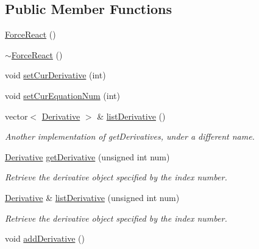 \subsection*{Public Member Functions}
\begin{DoxyCompactItemize}
\item 
\hyperlink{class_force_react_ac8f8b24f67f93f43ae1bb9c464a2d8d4}{Force\-React} ()
\item 
\hyperlink{class_force_react_a585f55d5c31c4951824bce98b6582afb}{$\sim$\-Force\-React} ()
\item 
void \hyperlink{class_force_react_ac387126f0628a06b24f53012725e384f}{set\-Cur\-Derivative} (int)
\item 
void \hyperlink{class_force_react_aca5dc15ce68dd63183aced244c13992c}{set\-Cur\-Equation\-Num} (int)
\item 
vector$<$ \hyperlink{class_derivative}{Derivative} $>$ \& \hyperlink{class_force_react_a3c399af8c10b2dbf374c13d85917275e}{list\-Derivative} ()
\begin{DoxyCompactList}\small\item\em Another implementation of get\-Derivatives, under a different name. \end{DoxyCompactList}\item 
\hyperlink{class_derivative}{Derivative} \hyperlink{class_force_react_aaa5876da8ade31366fc75e3bb5d6ba42}{get\-Derivative} (unsigned int num)
\begin{DoxyCompactList}\small\item\em Retrieve the derivative object specified by the index number. \end{DoxyCompactList}\item 
\hyperlink{class_derivative}{Derivative} \& \hyperlink{class_force_react_a9966751cff2a417cfe04658a0038aa1b}{list\-Derivative} (unsigned int num)
\begin{DoxyCompactList}\small\item\em Retrieve the derivative object specified by the index number. \end{DoxyCompactList}\item 
\hypertarget{class_force_react_a1aad01d74720d18fd21dd9f70a8b6702}{void \hyperlink{class_force_react_a1aad01d74720d18fd21dd9f70a8b6702}{add\-Derivative} ()}\label{class_force_react_a1aad01d74720d18fd21dd9f70a8b6702}


\end{DoxyCompactItemize}
